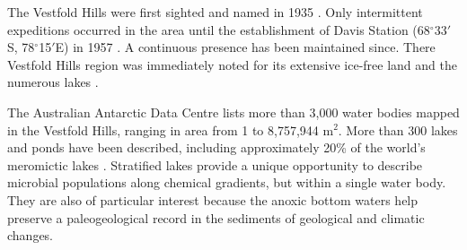 The Vestfold Hills were first sighted and named in 1935 \cite{Law1959}.
Only intermittent expeditions occurred in the area until the establishment of Davis Station (68$^{\circ}$33$'$S, 78$^{\circ}$15$'$E) in 1957 \cite{Law1959}. 
A continuous presence has been maintained since. %
There Vestfold Hills region was immediately noted for its extensive ice-free land and the numerous lakes \cite{Johnstone1973}.

The Australian Antarctic Data Centre lists more than 3,000 water bodies mapped in the Vestfold Hills, ranging in area from 1 to 8,757,944 m$^2$. %
More than 300 lakes and ponds have been described, including approximately 20\% of the world's meromictic lakes \cite{Gibson1999}. %
Stratified lakes provide a unique opportunity to describe microbial populations along chemical gradients, but within a single water body. 
They are also of particular interest because the anoxic bottom waters help preserve a paleogeological record in the sediments of geological and climatic changes.









